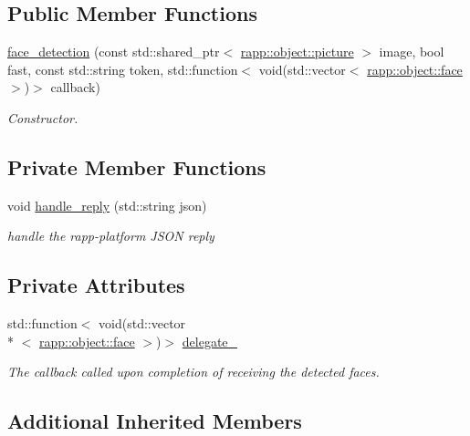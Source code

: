 \subsection*{Public Member Functions}
\begin{DoxyCompactItemize}
\item 
\hyperlink{classrapp_1_1cloud_1_1face__detection_a6bed7d3a0e26bfc9921f2f9b82aa8c83}{face\-\_\-detection} (const std\-::shared\-\_\-ptr$<$ \hyperlink{classrapp_1_1object_1_1picture}{rapp\-::object\-::picture} $>$ image, bool fast, const std\-::string token, std\-::function$<$ void(std\-::vector$<$ \hyperlink{classrapp_1_1object_1_1face}{rapp\-::object\-::face} $>$)$>$ callback)
\begin{DoxyCompactList}\small\item\em Constructor. \end{DoxyCompactList}\end{DoxyCompactItemize}
\subsection*{Private Member Functions}
\begin{DoxyCompactItemize}
\item 
void \hyperlink{classrapp_1_1cloud_1_1face__detection_a160f2cd18f65b7902b246204f42b6265}{handle\-\_\-reply} (std\-::string json)
\begin{DoxyCompactList}\small\item\em handle the rapp-\/platform J\-S\-O\-N reply \end{DoxyCompactList}\end{DoxyCompactItemize}
\subsection*{Private Attributes}
\begin{DoxyCompactItemize}
\item 
std\-::function$<$ void(std\-::vector\\*
$<$ \hyperlink{classrapp_1_1object_1_1face}{rapp\-::object\-::face} $>$)$>$ \hyperlink{classrapp_1_1cloud_1_1face__detection_a26e6d7655f431ecf1dfb6db5c9c1743a}{delegate\-\_\-}
\begin{DoxyCompactList}\small\item\em The callback called upon completion of receiving the detected faces. \end{DoxyCompactList}\end{DoxyCompactItemize}
\subsection*{Additional Inherited Members}


